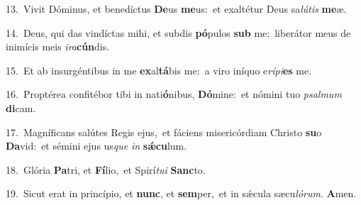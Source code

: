 {\numbfont\textcolor{\numbcolor}{13.}}~Vivit Dóminus, et benedíctus \textbf{De}\-us \textbf{me}\-us:~\star et exaltétur Deus sa\-\textit{lú}\-\textit{tis} \textbf{me}\-æ.\par
{\numbfont\textcolor{\numbcolor}{14.}}~Deus, qui das vindíctas mihi, et subdis \textbf{pó}\-pulos \textbf{sub} me:~\star liberátor meus de inimícis meis \textit{i}\-\textit{ra}\textbf{cún}dis.\par
{\numbfont\textcolor{\numbcolor}{15.}}~Et ab insurgéntibus in me \textbf{ex}\-al\-\textbf{tá}\-bis me:~\star a viro iníquo e\-\textit{rí}\-\textit{pi}\textbf{es} me.\par
{\numbfont\textcolor{\numbcolor}{16.}}~Proptérea confitébor tibi in nati\-\textbf{ó}\-nibus, \textbf{Dó}\-mine:~\star et nómini tuo \textit{psal}\-\textit{mum} \textbf{di}\-cam.\par
{\numbfont\textcolor{\numbcolor}{17.}}~Magníficans salútes Regis ejus,~\dagger et fáciens misericórdiam Christo \textbf{su}\-o \textbf{Da}\-vid:~\star et sémini ejus us\textit{que} \textit{in} \textbf{sǽ}\-\textbf{cu}lum.\par
{\numbfont\textcolor{\numbcolor}{18.}}~Glória \textbf{Pa}\-tri, et \textbf{Fí}\-lio,~\star et Spirí\-\textit{tu}\-\textit{i} \textbf{Sanc}\-to.\par
{\numbfont\textcolor{\numbcolor}{19.}}~Sicut erat in princípio, et \textbf{nunc}\-, et \textbf{sem}\-per,~\star et in sǽcula sæcu\-\textit{ló}\-\textit{rum}. \textbf{A}\-men.\par
